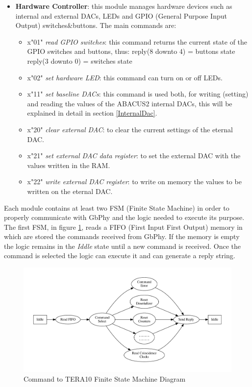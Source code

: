 \begin{itemize}
	\item \textbf{Hardware Controller}: this module manages hardware devices such as internal and external DACs, LEDs and GPIO (General Purpose Input Output) switches\&buttons. The main commands are:
	\begin{itemize}
		\item x"01" \textit{read GPIO switches}: this command returns the current state of the GPIO switches and buttons, thus:
		\newline
		reply(8 downto 4) = buttons state
		\newline
		reply(3 downto 0) = switches state
		\item x"02" \textit{set hardware LED}: this command can turn on or off LEDs.
		\item x"11" \textit{set baseline DACs}: this command is used both, for writing (setting) and reading the values of the ABACUS2 internal DACs, this will be explained in detail in section \ref{InternalDac}.
		\item x"20" \textit{clear external DAC}: to clear the current settings of the eternal DAC. 
		\item x"21" \textit{set external DAC data register}: to set the external DAC with the values written in the RAM.
		\item x"22" \textit{write external DAC register}: to write on memory the values to be written on the eternal DAC.
	\end{itemize}  
		
\end{itemize}
\noindent Each module contains at least two FSM (Finite State Machine) in order to properly communicate with GbPhy and the logic needed to execute its purpose. The first FSM, in figure \ref{fig:fsmFIFO1}, reads a FIFO (First Input First Output) memory in which are stored the commands received from GbPhy. If the memory is empty the logic remains in the \textit{Iddle} state until a new command is received. Once the command is selected the logic can execute it and can generate a reply string.
\begin{figure}[H]
	\centering
	\includegraphics[width=1.0\linewidth]{FSMdiagrams/CMDtoTERA10.pdf}
	\caption{Command to TERA10 Finite State Machine Diagram}
	\label{fig:fsmFIFO1}
\end{figure}
